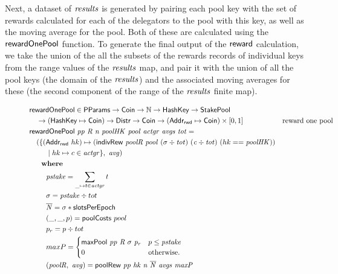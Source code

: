 Next, a dataset of $\mathit{results}$ is generated by pairing each pool key with
the set of rewards calculated for each of the delegators to the pool with this
key, as well as the moving average for the pool. Both of these are calculated
using the $\mathsf{rewardOnePool}$ function.  To generate the final output of the
$\mathsf{reward}$ calculation, we take the union of the all the subsets of the
rewards records of individual keys from the range values of the $\mathit{results}$
map, and pair it with the union of all the pool keys (the domain of the
$\mathit{results}$) and the associated moving averages for these (the second
component of the range of the $\mathit{results}$ finite map).

\begin{figure}[htb]
  \begin{align*}
      & \fun{rewardOnePool} \in \PParams \to \Coin \to \mathbb{N} \to \HashKey \to \StakePool\\
      & ~~~\to (\HashKey \mapsto \Coin)\to \Distr \to \Coin \to (\AddrRWD \mapsto \Coin)\times[0, 1]
      & \text{reward one pool} \\
      & \fun{rewardOnePool}~\var{pp}~\var{R}~\var{n}~\var{poolHK}~\var{pool}
        ~\var{actgr}~\var{avgs}~\var{tot} = \\
      & ~~~(\{ (\AddrRWD~hk)\mapsto ( \fun{indivRew}~\var{poolR}~\var{pool}
                                 ~(\sigma\div\var{tot})~(\var{c}\div\var{tot})~(hk ==\var{poolHK})) \\
      & ~~~~~~~\mid hk\mapsto c\in\var{actgr}\},~\var{avg})\\
      & ~~~\where \\
      & ~~~~~~~\var{pstake} = \sum_{\_\mapsto t\in\var{actgr}} t \\
      & ~~~~~~~\sigma = \var{pstake} \div tot \\
      & ~~~~~~~\var{\overline{N}} = \sigma * \slotsPer\\
      & ~~~~~~~(\_, \_, p) = \fun{poolCosts}~pool \\
      & ~~~~~~~p_{r} = p \div tot \\
      & ~~~~~~~maxP =
      \begin{cases}
          \fun{maxPool}~\var{pp}~\var{R}~\sigma~\var{p_r}&
              p \leq \var{pstake}\\
          0 & \text{otherwise.}
        \end{cases} \\
      & ~~~~~~~(\var{poolR},~\var{avg}) = \fun{poolRew}~\var{pp}~\var{hk}~\var{n}~\var{\overline{N}}~\var{avgs}~\var{maxP} \\

\end{align*}
\end{figure}
